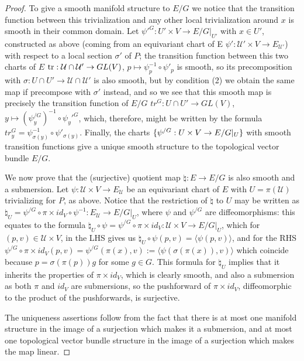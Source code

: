\begin{proof}
To give a smooth manifold structure to $E/G$ we notice that the transition function between this trivialization and any other local trivialization around $x$ is smooth in their common domain. Let $\psi'^G:U' \times V \to E/G|_{U'}$ with $x \in U'$, constructed as above (coming from an equivariant chart of E $\psi': \mathcal U' \times V \to E_{\mathcal U'}$) with respect to a local section $\sigma'$ of $P$; the transition function between this two charts of $E$ $\operatorname{tr}: \mathcal U \cap \mathcal U' \to GL(V)$, $p \mapsto \psi^{-1}_p \circ \psi'_p$ is smooth, so its precomposition with $\sigma: U \cap U' \to \mathcal U \cap \mathcal U'$ is also smooth, but by condition (2) we obtain the same map if precompose with $\sigma'$ instead, and so we see that this smooth map is precisely the transition function of $E/G$ $tr^{G}: U \cap U' \to GL(V)$, $y \mapsto (\psi_y^{/G})^{-1} \circ \psi_y'^G$, which, therefore, might be written by the formula $tr^G_y = \psi^{-1}_{\sigma(y)} \circ \psi'_{\sigma(y)}$. Finally, the charts $\{\psi^{/G}:U \times V \to E/G|_U\}$ with smooth transition functions give a unique smooth structure to the topological vector bundle $E/G$.

We now prove that the (surjective) quotient map $\natural : E \to E/G$ is also smooth and a submersion. Let $\psi: \mathcal U \times V \to E_{\mathcal U}$ be an equivariant chart of $E$ with $U = \pi(\mathcal U)$ trivializing for $P$, as above. Notice that the restriction of $\natural$ to $U$ may be written as $\natural_U = \psi^{/G} \circ \pi \times id_V \circ \psi^{-1}: E_{\mathcal U} \to E/G|_U$, where $\psi$ and $\psi^{/G}$ are diffeomorphisms: this equates to the formula $\natural_U \circ \psi = \psi^{/G} \circ \pi \times id_V: \mathcal U \times V \to E/G|_U$, which for $(p, v) \in \mathcal U \times V$, in the LHS gives us $\natural_U \circ \psi(p, v) = \langle\psi(p, v)\rangle$, and for the RHS $\psi^{/G} \circ \pi \times id_V (p, v) = \psi^{/G}(\pi(x), v) := \langle\psi(\sigma(\pi(x)), v)\rangle$ which coincide because $p = \sigma(\pi(p))g$ for some $g \in G$. This formula for $\natural_U$ implies that it inherits the properties of $\pi \times id_V$, which is clearly smooth, and also a submersion as both $\pi$ and $id_V$ are submersions, so the pushforward of $\pi \times id_V$, diffeomorphic to the product of the pushforwards, is surjective.

The uniqueness assertions follow from the fact that there is at most one manifold structure in the image of a surjection which makes it a submersion, and at most one topological vector bundle structure in the image of a surjection which makes the map linear.

\end{proof}

